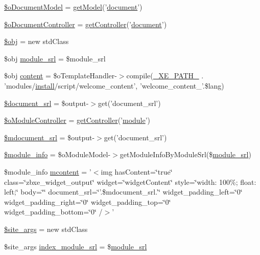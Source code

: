 \begin{DoxyCompactItemize}
\hyperlink{ko_8install_8php_afb18aa87e5520385e76377e876e042af}{\$o\+Document\+Model} = \hyperlink{func_8inc_8php_aecdfcc5332bcf22df01fc21a03b64435}{get\+Model}('\hyperlink{classdocument}{document}')
\item 
\hyperlink{ko_8install_8php_aac43fce682d4b7a05df6d3e44c2c54e6}{\$o\+Document\+Controller} = \hyperlink{func_8inc_8php_aa08f01e3bf130d770b373ca8493e3e9b}{get\+Controller}('\hyperlink{classdocument}{document}')
\item 
\hyperlink{ko_8install_8php_a9008ed94ba185855b1723e367744b87e}{\$obj} = new std\+Class
\item 
\$obj \hyperlink{ko_8install_8php_a370bb6450fab1da3e0ed9f484a38b761}{module\+\_\+srl} = \$module\+\_\+srl
\item 
\$obj \hyperlink{ko_8install_8php_a65dddc3e5e47cb506e6b5417ffb3bdef}{content} = \$o\+Template\+Handler-\/$>$compile(\hyperlink{config_8inc_8php_a5387c7a3f2aa38adf16f324cee88db88}{\+\_\+\+X\+E\+\_\+\+P\+A\+T\+H\+\_\+} . 'modules/\hyperlink{classinstall}{install}/script/welcome\+\_\+content', 'welcome\+\_\+content\+\_\+'.\$lang)
\item 
\hyperlink{ko_8install_8php_a14522e7fff0604a8372c75b4a0fbc0fd}{\$document\+\_\+srl} = \$output-\/$>$get('document\+\_\+srl')
\item 
\hyperlink{ko_8install_8php_aaae9128654f5054258982d94a0566987}{\$o\+Module\+Controller} = \hyperlink{func_8inc_8php_aa08f01e3bf130d770b373ca8493e3e9b}{get\+Controller}('\hyperlink{classmodule}{module}')
\item 
\hyperlink{ko_8install_8php_a27c211d9a984964f84c8ffb6ea7328fc}{\$mdocument\+\_\+srl} = \$output-\/$>$get('document\+\_\+srl')
\item 
\hyperlink{ko_8install_8php_a5e701819149f6ea0893d4b79010417d3}{\$module\+\_\+info} = \$o\+Module\+Model-\/$>$get\+Module\+Info\+By\+Module\+Srl(\$\hyperlink{ko_8install_8php_a370bb6450fab1da3e0ed9f484a38b761}{module\+\_\+srl})
\item 
\$module\+\_\+info \hyperlink{ko_8install_8php_a9da4bb6e77356bb68ae0e05dbd9f5e2f}{mcontent} = '$<$img has\+Content=\char`\"{}true\char`\"{} class=\char`\"{}zbxe\+\_\+widget\+\_\+output\char`\"{} widget=\char`\"{}widget\+Content\char`\"{} style=\char`\"{}width\+: 100\%; float\+: left;\char`\"{} body=\char`\"{}\char`\"{} document\+\_\+srl=\char`\"{}'.\$mdocument\+\_\+srl.'\char`\"{} widget\+\_\+padding\+\_\+left=\char`\"{}0\char`\"{} widget\+\_\+padding\+\_\+right=\char`\"{}0\char`\"{} widget\+\_\+padding\+\_\+top=\char`\"{}0\char`\"{} widget\+\_\+padding\+\_\+bottom=\char`\"{}0\char`\"{} /$>$'
\item 
\hyperlink{ko_8install_8php_a19e0fcfacd69155c9cc255e5500f6ccc}{\$site\+\_\+args} = new std\+Class
\item 
\$site\+\_\+args \hyperlink{ko_8install_8php_acd0b17bfe6d14c82871d73fa39c9c22d}{index\+\_\+module\+\_\+srl} = \$\hyperlink{ko_8install_8php_a370bb6450fab1da3e0ed9f484a38b761}{module\+\_\+srl}
\end{DoxyCompactItemize}


